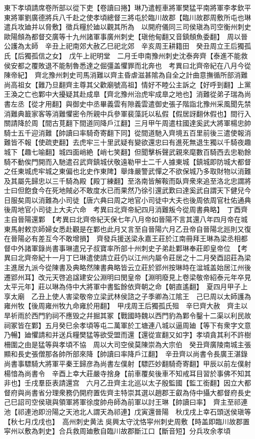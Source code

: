 東下孝頃請席卷所部以從下吏【卷讀曰捲】琳乃遣輕車將軍樊猛平南將軍李孝欽平東將軍劉廣德將兵八千赴之使孝頃總督三將屯於臨川故郡【臨川故郡周敷所屯也琳遣兵攻廸并以脅敷】徵兵糧於廸以觀其所為　以開府儀同三司侯瑱為司空衡州刺史歐陽頠為都督交廣等十九州諸軍事廣州刺史【瑱他甸翻又音鎮頠魚委翻】　周以晉公護為太師　辛丑上祀南郊大赦乙巳祀北郊　辛亥周王耕籍田　癸丑周立王后獨孤氏【后獨孤信之女】　戊午上祀明堂　二月壬申南豫州刺史沈泰奔齊【泰進不能救侯安都之覆敗退不能制魯悉達之倔彊盖懼罪而北奔也　考異曰北齊帝紀在八月今從陳帝紀】　齊北豫州刺史司馬消難以齊主昏虐滋甚隂為自全之計曲意撫循所部消難尚高祖女【難乃旦翻齊主尊其父歡廟號高祖】情好不睦公主訴之【好呼到翻】上黨王渙之亡也鄴中大擾疑其赴成臯【齊北豫州治虎牢成臯之地也】消難從弟子瑞為尚書左丞【從才用翻】與御史中丞畢義雲有隙義雲遣御史張子階詣北豫州采風聞先禁消難典籖家客等消難懼密令所親中兵參軍裴藻託以私假【假居訝翻休假也】間行入關請降於周【間古莧翻下間道同降戶江翻】三月甲午周遣柱國達奚武大將軍楊忠帥騎士五千迎消難【帥讀曰率騎奇寄翻下同】從間道馳入齊境五百里前後三遣使報消難皆不報【使疏吏翻】去虎牢三十里武疑有變欲還忠曰有進死無退生獨以千騎夜趣城下【趣七喻翻】城四面峭絶【峭七笑翻】但聞擊柝聲武親來麾數百騎西去忠勒餘騎不動俟門開而入馳遣召武齊鎮城伏敬遠勒甲士二千人據東城【鎮城即防城大都督之任東城虎牢城之東偏也北史作東陴】舉烽嚴警武憚之不欲保城乃多取財物以消難及其屬先歸忠以三千騎為殿【殿丁練翻】至洛南皆解鞍而臥齊衆來追至洛北忠謂將士曰但飽食今在死地賊必不敢度水已而果然乃徐引還武歎曰達奚武自謂天下健兒今日服矣周以消難為小司徒【唐六典曰周之地官小司徒中大夫也後周依周官杜佑通典後周地官小司徒上大夫六命　考異曰北齊帝紀四月消難叛今從周書典略】　丁酉齊主自晉陽還鄴　【考異曰北齊帝紀天保七年八月帝如晉陽不言其還八年四月帝在城東馬射敕京師婦女悉赴觀是在鄴也此月又言至自晉陽六月乙丑帝自晉陽北廵則又復在晉陽必有差互今不敢增損】　齊發兵援送梁永嘉王莊於江南冊拜王琳為梁丞相都督中外諸軍錄尚書事琳遣兄子叔寶率所部十州刺史子弟赴鄴琳奉莊即皇帝位　【考異曰北齊帝紀十一月丁巳琳遣使請立莊仍以江州内屬令莊居之十二月癸酉詔莊為梁主進居九派今從陳書及典略然陳書典略皆云立莊於郢州按琳時在湓城盖始居江州後遷郢州耳】改元天啓追諡建安公淵明曰閔皇帝【淵明廢見上卷梁敬帝紹泰元年卒見太平元年】莊以琳為侍中大將軍中書監餘依齊朝之命【朝直遙翻】　夏四月甲子上享太廟　乙丑上使人害梁敬帝立梁武林侯諮之子季卿為江隂王　己巳周以太師護為雍州牧【後周雍州牧九命雍於用翻】　甲戌周王后獨孤氏殂　辛巳齊大赦　齊主以旱祈雨於西門豹祠不應毁之幷掘其冢【戰國時魏以西門豹為鄴令鑿十二渠以利民故祠冢皆在鄴】五月癸巳余孝頃等屯二萬軍於工塘連八城以逼周廸【等下有衆字文意乃暢】廸懼請和并送兵糧樊猛等欲受盟而還【還從宣翻又如字】孝頃貪其利不許樹柵圍之由是猛等與孝頃不協　周以大司空侯莫陳崇為大宗伯　癸丑齊廣陵南城主張顯和長史張僧那各帥所部來降【帥讀曰率降戶江翻】　辛丑齊以尚書令長廣王湛錄尚書事驃騎大將軍平秦王歸彦為尚書左僕射【驃匹妙翻騎奇寄翻】甲辰以前左僕射楊愔為尚書令　辛酉上幸大莊嚴寺捨身【前車覆矣後車不知戒耳目習於事佛不知其非也】壬戌羣臣表請還宫　六月乙丑齊主北巡以太子殷監國【監工銜翻】因立大都督府與尚書省分理衆務仍開府置佐齊主特崇其選以趙郡王叡為侍中攝大都督府長史　己巳詔司空侯瑱與領軍將軍徐度帥舟師為前軍以討王琳【帥讀曰率】　齊主至祁連池【祁連池即汾陽之天池北人謂天為祁連】戊寅還晉陽　秋戊戌上幸石頭送侯瑱等【秋七月戊戌也】　高州刺史黄法吳興太守沈恪寜州刺史周敷【時盖即臨川故郡置寜州以敷為刺史】合兵救周廸敷自臨川故郡斷江口【斷音短】分兵攻余孝頃
